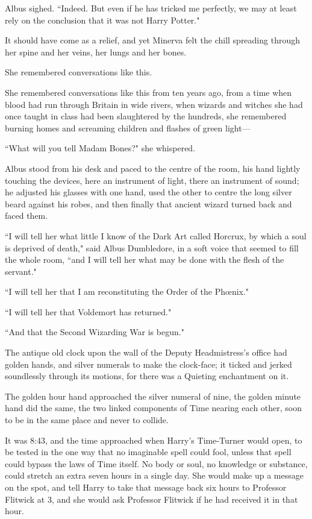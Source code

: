Albus sighed. ``Indeed. But even if he has tricked me perfectly, we may at least rely on the conclusion that it was not Harry Potter."

It should have come as a relief, and yet Minerva felt the chill spreading through her spine and her veins, her lungs and her bones.

She remembered conversations like this.

She remembered conversations like this from ten years ago, from a time when blood had run through Britain in wide rivers, when wizards and witches she had once taught in class had been slaughtered by the hundreds, she remembered burning homes and screaming children and flashes of green light---

``What will you tell Madam Bones?" she whispered.

Albus stood from his desk and paced to the centre of the room, his hand lightly touching the devices, here an instrument of light, there an instrument of sound; he adjusted his glasses with one hand, used the other to centre the long silver beard against his robes, and then finally that ancient wizard turned back and faced them.

``I will tell her what little I know of the Dark Art called Horcrux, by which a soul is deprived of death," said Albus Dumbledore, in a soft voice that seemed to fill the whole room, ``and I will tell her what may be done with the flesh of the servant."

``I will tell her that I am reconstituting the Order of the Phœnix."

``I will tell her that Voldemort has returned."

``And that the Second Wizarding War is begun."


The antique old clock upon the wall of the Deputy Headmistress's office had golden hands, and silver numerals to make the clock-face; it ticked and jerked soundlessly through its motions, for there was a Quieting enchantment on it.

The golden hour hand approached the silver numeral of nine, the golden minute hand did the same, the two linked components of Time nearing each other, soon to be in the same place and never to collide.

It was 8:43\pm, and the time approached when Harry's Time-Turner would open, to be tested in the one way that no imaginable spell could fool, unless that spell could bypass the laws of Time itself. No body or soul, no knowledge or substance, could stretch an extra seven hours in a single day. She would make up a message on the spot, and tell Harry to take that message back six hours to Professor Flitwick at 3\pm, and she would ask Professor Flitwick if he had received it in that hour.

